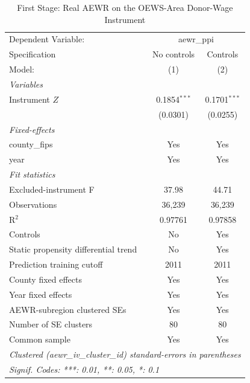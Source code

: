 
\begin{table}[htbp]
   \caption{\label{tab:iv_preferred_first_stage} First Stage: Real AEWR on the OEWS-Area Donor-Wage Instrument}
   \centering
   \begin{tabular}{lcc}
      \tabularnewline \midrule \midrule
      Dependent Variable: & \multicolumn{2}{c}{aewr\_ppi}\\
      Specification                        & No controls    & Controls \\
      Model:                               & (1)            & (2)\\
      \midrule
      \emph{Variables}\\
      Instrument $Z$                       & 0.1854$^{***}$ & 0.1701$^{***}$\\
                                           & (0.0301)       & (0.0255)\\
      \midrule
      \emph{Fixed-effects}\\
      county\_fips                         & Yes            & Yes\\
      year                                 & Yes            & Yes\\
      \midrule
      \emph{Fit statistics}\\
      Excluded-instrument F                & 37.98          & 44.71\\
      Observations                         & 36,239         & 36,239\\
      R$^2$                                & 0.97761        & 0.97858\\
      Controls                             & No             & Yes\\
      Static propensity differential trend & No             & Yes\\
      Prediction training cutoff           & 2011           & 2011\\
      County fixed effects                 & Yes            & Yes\\
      Year fixed effects                   & Yes            & Yes\\
      AEWR-subregion clustered SEs         & Yes            & Yes\\
      Number of SE clusters                & 80             & 80\\
      Common sample                        & Yes            & Yes\\
      \midrule \midrule
      \multicolumn{3}{l}{\emph{Clustered (aewr\_iv\_cluster\_id) standard-errors in parentheses}}\\
      \multicolumn{3}{l}{\emph{Signif. Codes: ***: 0.01, **: 0.05, *: 0.1}}\\
   \end{tabular}


\end{table}

